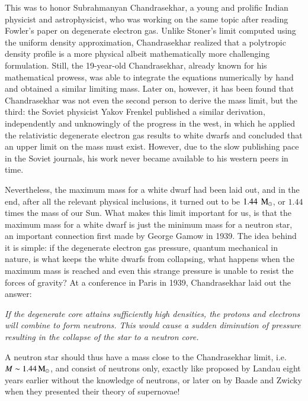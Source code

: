 This was to honor Subrahmanyan Chandrasekhar, a young and prolific Indian physicist and astrophysicist, who was working on the same topic after reading Fowler's paper on degenerate electron gas.
Unlike Stoner's limit computed using the uniform density approximation, Chandrasekhar realized that a polytropic density profile is a more physical albeit mathematically more challenging formulation.
Still, the 19-year-old Chandrasekhar, already known for his mathematical prowess, was able to integrate the equations numerically by hand and obtained a similar limiting mass\cite{Cha31}.
Later on, however, it has been found that Chandrasekhar was not even the second person to derive the mass limit, but the third:\cite{Yakovlev94}
the Soviet physicist Yakov Frenkel published a similar derivation, independently and unknowingly of the progress in the west, in which he applied the relativistic degenerate electron gas results to white dwarfs and concluded that an upper limit on the mass must exist\cite{Frenkel28}.
However, due to the slow publishing pace in the Soviet journals, his work never became available to his western peers in time.


Nevertheless, the maximum mass for a white dwarf had been laid out, and in the end, after all the relevant physical inclusions, it turned out to be $1.44~\, \mathrm{M}_{\odot}$, or $1.44$ times the mass of our Sun.
What makes this limit important for us, is that the maximum mass for a white dwarf is just the minimum mass for a neutron star,
an important connection first made by George Gamow in 1939\cite{Gamow39}.
The idea behind it is simple: 
if the degenerate electron gas pressure, quantum mechanical in nature, is what keeps the white dwarfs from collapsing, what happens when the maximum mass is reached and even this strange pressure is unable to resist the forces of gravity?
At a conference in Paris in 1939, Chandrasekhar laid out the answer:
\begin{displayquote}
    \textit{
    If the degenerate core attains sufficiently high densities, the protons and electrons will combine to form neutrons. 
    This would cause a sudden diminution of pressure resulting in the collapse of the star to a neutron core.
    }
\end{displayquote}
A neutron star should thus have a mass close to the Chandrasekhar limit, i.e. $M \sim 1.44\, \mathrm{M}_{\odot}$, and consist of neutrons only, exactly like proposed by Landau eight years earlier without the knowledge of neutrons, or later on by Baade and Zwicky when they presented their theory of supernovae!


